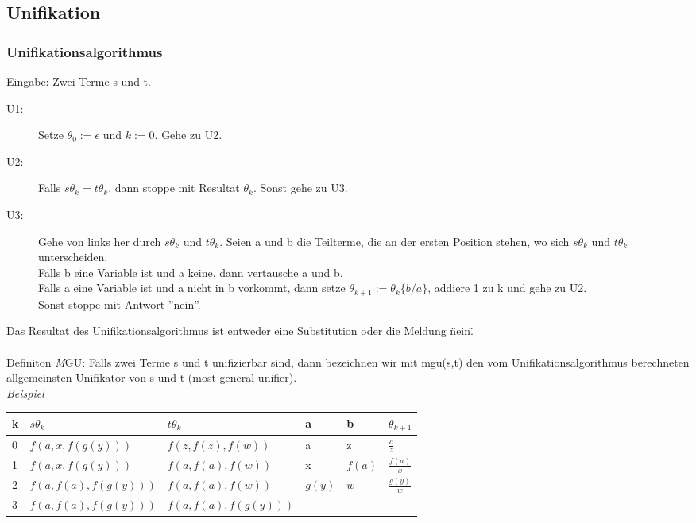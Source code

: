 \documentclass[11pt, a4paper,twocolumn]{scrartcl}
\begin{document}
\subsection{Unifikation}

\subsubsection{Unifikationsalgorithmus}
Eingabe: Zwei Terme s und t.
\begin{description}
 \item[U1:] Setze $\theta_0:=\epsilon$ und $k:=0$. Gehe zu U2.
 \item[U2:] Falls $s\theta_k=t\theta_k$, dann stoppe mit Resultat $\theta_k$. Sonst gehe zu U3.
 \item[U3:] Gehe von links her durch $s\theta_k$ und $t\theta_k$. Seien a und b die Teilterme, die an der ersten Position stehen, wo sich $s\theta_k$ und $t\theta_k$ unterscheiden.\\
 Falls b eine Variable ist und a keine, dann vertausche a und b.\\
 Falls a eine Variable ist und a nicht in b vorkommt, dann setze $\theta_{k+1}:=\theta_k\{b/a\}$, addiere 1 zu k und gehe zu U2.\\
 Sonst stoppe mit Antwort ''nein''.
\end{description}
Das Resultat des Unifikationsalgorithmus ist entweder eine Substitution oder die Meldung \"nein\".\\\\

Definiton {\textit MGU}: Falls zwei Terme s und t unifizierbar sind, dann bezeichnen wir mit mgu(s,t) den vom Unifikationsalgorithmus berechneten allgemeinsten Unifikator von s und t (most general unifier).\\

\textit{Beispiel}\\
\tiny
\begin{tabular}{l|l|l|l|l|l}
 k &	$s\theta_k$ &		$t\theta_k$ &		a &		b &		$\theta_{k+1}$\\\hline
 0 &	$f(a,x,f(g(y)))$ &	$f(z,f(z),f(w))$ &	a &		z &		$\frac{a}{z}$\\
 1 &	$f(a,x,f(g(y)))$ &	$f(a,f(a),f(w))$ &	x &		$f(a)$ &	$\frac{f(a)}{x}$\\
 2 &	$f(a,f(a),f(g(y)))$ &	$f(a,f(a),f(w))$ &	$g(y)$ &	$w$ &		$\frac{g(y)}{w}$\\
 3 &	$f(a,f(a),f(g(y)))$ &	$f(a,f(a),f(g(y)))$ &	&		&		\\
\end{tabular}
\normalsize
\end{document}
